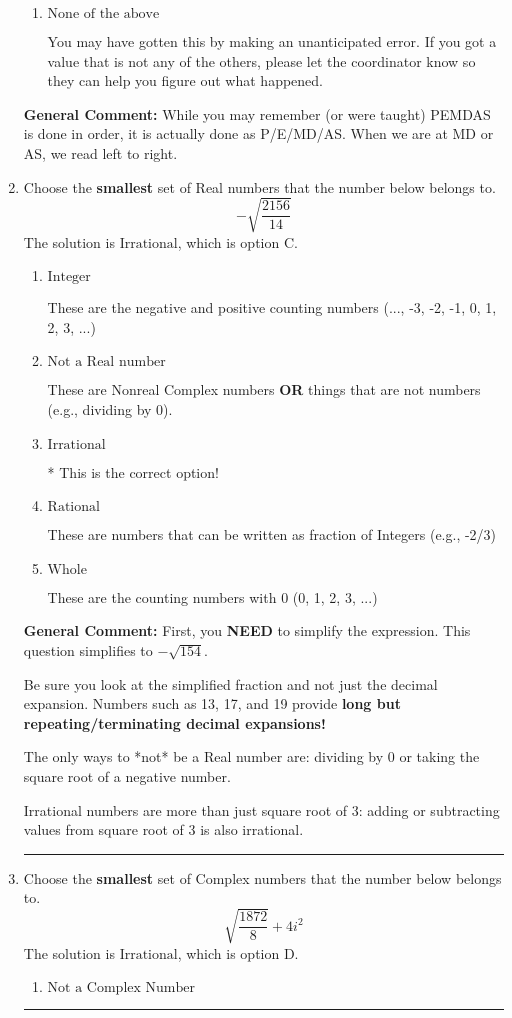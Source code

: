 \documentclass{extbook}[14pt]
\newcommand{\litem}[1]{\item #1

\rule{\textwidth}{0.4pt}}
\begin{document}
\begin{enumerate}
{\begin{enumerate}[label=\Alph*.]
 9.975, which corresponds to an Order of Operations error: multiplying by negative before squaring. For example: $(-3)^2 \neq -3^2$
\item \( \text{None of the above} \)

 You may have gotten this by making an unanticipated error. If you got a value that is not any of the others, please let the coordinator know so they can help you figure out what happened.
\end{enumerate}

\textbf{General Comment:} While you may remember (or were taught) PEMDAS is done in order, it is actually done as P/E/MD/AS. When we are at MD or AS, we read left to right.
}
\litem{
Choose the \textbf{smallest} set of Real numbers that the number below belongs to.
\[ -\sqrt{\frac{2156}{14}} \]The solution is \( \text{Irrational} \), which is option C.\begin{enumerate}[label=\Alph*.]
\item \( \text{Integer} \)

These are the negative and positive counting numbers (..., -3, -2, -1, 0, 1, 2, 3, ...)
\item \( \text{Not a Real number} \)

These are Nonreal Complex numbers \textbf{OR} things that are not numbers (e.g., dividing by 0).
\item \( \text{Irrational} \)

* This is the correct option!
\item \( \text{Rational} \)

These are numbers that can be written as fraction of Integers (e.g., -2/3)
\item \( \text{Whole} \)

These are the counting numbers with 0 (0, 1, 2, 3, ...)
\end{enumerate}

\textbf{General Comment:} First, you \textbf{NEED} to simplify the expression. This question simplifies to $-\sqrt{154}$. 
 
 Be sure you look at the simplified fraction and not just the decimal expansion. Numbers such as 13, 17, and 19 provide \textbf{long but repeating/terminating decimal expansions!} 
 
 The only ways to *not* be a Real number are: dividing by 0 or taking the square root of a negative number. 
 
 Irrational numbers are more than just square root of 3: adding or subtracting values from square root of 3 is also irrational.
}
\litem{
Choose the \textbf{smallest} set of Complex numbers that the number below belongs to.
\[ \sqrt{\frac{1872}{8}}+4i^2 \]The solution is \( \text{Irrational} \), which is option D.\begin{enumerate}[label=\Alph*.]
\item \( \text{Not a Complex Number} \)


\end{enumerate}}
\end{enumerate}
\end{document}
